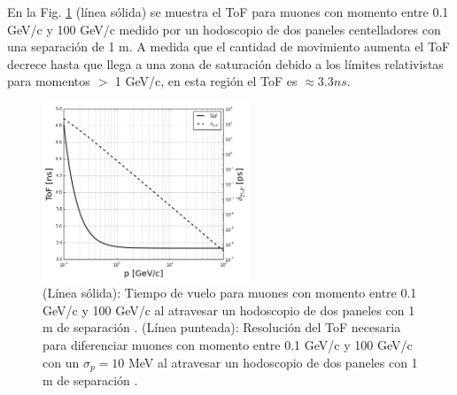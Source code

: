 En la Fig. \ref{ToF} (línea sólida) se muestra el ToF  para muones con momento entre 0.1 GeV/c y 100 GeV/c medido por un hodoscopio de dos paneles centelladores con una separación de 1 m. A medida que el cantidad de movimiento aumenta el ToF decrece hasta que llega a una zona de saturación debido a los límites relativistas para momentos $>$ 1 GeV/c, en esta región el ToF es $\approx 3.3 ns$.

\begin{figure}[h!]
\begin{center}
\includegraphics[width=0.55\textwidth]{Figures/ToF_Mix.png}
\caption[Resolución del ToF necesaria para diferenciar muones con momento entre 0.1 GeV/c y 100 GeV/c con un $\sigma_p = 10$ MeV]{(Línea sólida): Tiempo de vuelo para muones con momento entre 0.1 GeV/c y 100 GeV/c al atravesar un hodoscopio de dos paneles con 1 m de separación \cite{Williams2012, Best2015}. (Línea punteada): Resolución del ToF necesaria para diferenciar muones con momento entre 0.1 GeV/c y 100 GeV/c con un $\sigma_p = 10$ MeV al atravesar un hodoscopio de dos paneles con 1 m de separación \cite{Genat2009, Lippmann2012}.}
\label{ToF}
\end{center}
\end{figure}


